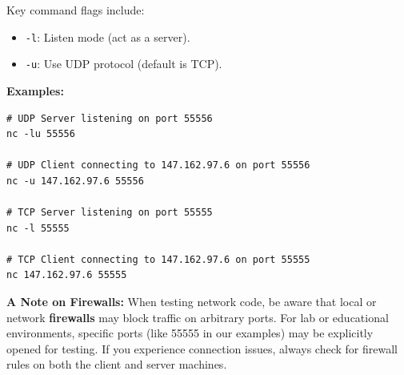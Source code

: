 \documentclass{article}
\begin{document}
Key command flags include:

\begin{itemize}
    \item \texttt{-l}: Listen mode (act as a server).
    \item \texttt{-u}: Use UDP protocol (default is TCP).
\end{itemize}

\textbf{Examples:}

\begin{verbatim}
# UDP Server listening on port 55556
nc -lu 55556

# UDP Client connecting to 147.162.97.6 on port 55556
nc -u 147.162.97.6 55556

# TCP Server listening on port 55555
nc -l 55555

# TCP Client connecting to 147.162.97.6 on port 55555
nc 147.162.97.6 55555
\end{verbatim}

\textbf{A Note on Firewalls:} When testing network code, be aware that local or network \textbf{firewalls} may block traffic on arbitrary ports. For lab or educational environments, specific ports (like 55555 in our examples) may be explicitly opened for testing. If you experience connection issues, always check for firewall rules on both the client and server machines.
\end{document}
